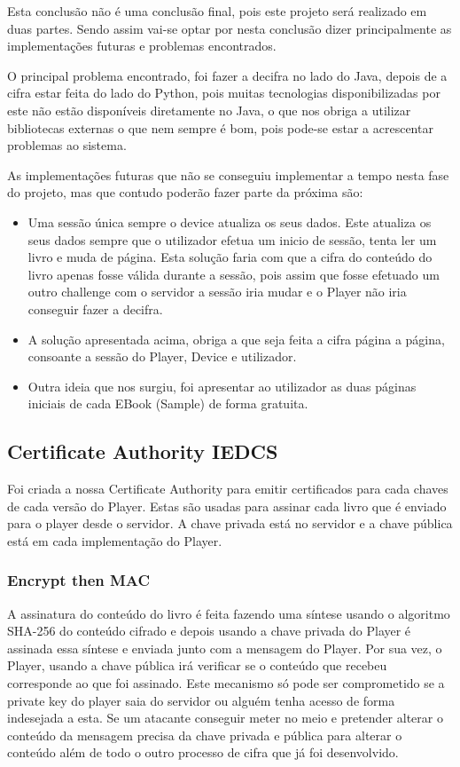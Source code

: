 \documentclass[pdftex,12pt,a4paper]{report}
\begin{document}
Esta conclusão não é uma conclusão final, pois este projeto será realizado em duas partes.
Sendo assim vai-se optar por nesta conclusão dizer principalmente as implementações futuras e problemas encontrados.

O principal problema encontrado, foi fazer a decifra no lado do Java, depois de a cifra estar feita do lado do Python, pois muitas tecnologias disponibilizadas por este não estão disponíveis diretamente no Java, o que nos obriga a utilizar bibliotecas externas o que nem sempre é bom, pois pode-se estar a acrescentar problemas ao sistema. 

As implementações futuras que não se conseguiu implementar a tempo nesta fase do projeto, mas que contudo poderão fazer parte da próxima são:
\begin{itemize}
\item Uma sessão única sempre o device atualiza os seus dados. Este atualiza os seus dados sempre que o utilizador efetua um inicio de sessão, tenta ler um livro e muda de página. Esta solução faria com que a cifra do conteúdo do livro apenas fosse válida durante a sessão, pois assim que fosse efetuado um outro challenge com o servidor a sessão iria mudar e o Player não iria conseguir fazer a decifra.
\item A solução apresentada acima, obriga a que seja feita a cifra página a página, consoante a sessão do Player, Device e utilizador.
\item Outra ideia que nos surgiu, foi apresentar ao utilizador as duas páginas iniciais de cada EBook (Sample) de forma gratuita.
\end{itemize}

\subsection{Certificate Authority IEDCS}
Foi criada a nossa Certificate Authority para emitir certificados para cada chaves de cada versão do Player. Estas são usadas para assinar cada livro que é enviado para o player desde o servidor. A chave privada está no servidor e a chave pública está em cada implementação do Player.

\subsubsection{Encrypt then MAC}

A assinatura do conteúdo do livro é feita fazendo uma síntese usando o algoritmo SHA-256 do conteúdo cifrado e depois usando a chave privada do Player é assinada essa síntese e enviada junto com a mensagem do Player. Por sua vez, o Player, usando a chave pública irá verificar se o conteúdo que recebeu corresponde ao que foi assinado.
Este mecanismo só pode ser comprometido se a private key do player saia do servidor ou alguém tenha acesso de forma indesejada a esta. Se um atacante conseguir meter no meio e pretender alterar o conteúdo da mensagem precisa da chave privada e pública para alterar o conteúdo além de todo o outro processo de cifra que já foi desenvolvido. 
\end{document}
